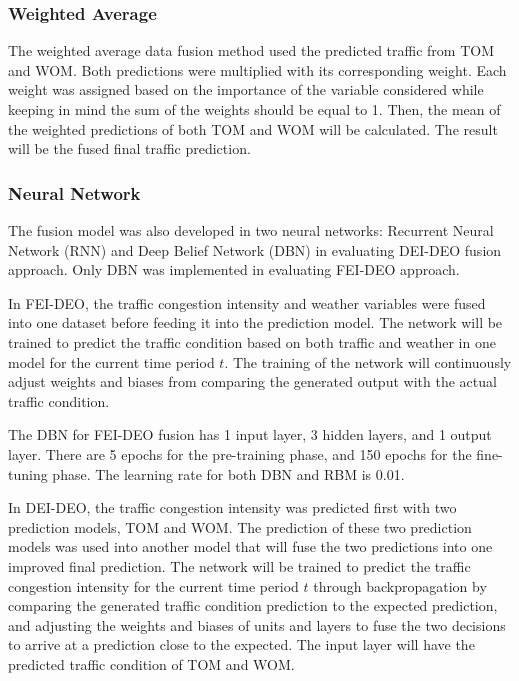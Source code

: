 \subsubsection{Weighted Average}
The weighted average data fusion method used the predicted traffic from TOM and WOM. Both predictions were multiplied with its corresponding weight. Each weight was assigned based on the importance of the variable considered while keeping in mind the sum of the weights should be equal to 1. Then, the mean of the weighted predictions of both TOM and WOM will be calculated. The result will be the fused final traffic prediction.



\subsubsection{Neural Network}
The fusion model was also developed in two neural networks: Recurrent Neural Network (RNN) and Deep Belief Network (DBN) in evaluating DEI-DEO fusion approach. Only DBN was implemented in evaluating FEI-DEO approach.

In FEI-DEO, the traffic congestion intensity and weather variables were fused into one dataset before feeding it into the prediction model. The network will be trained to predict the traffic condition based on both traffic and weather in one model for the current time period $t$. The training of the network will continuously adjust weights and biases from comparing the generated output with the actual traffic condition.

The DBN for FEI-DEO fusion has 1 input layer, 3 hidden layers, and 1 output layer. There are 5 epochs for the pre-training phase, and 150 epochs for the fine-tuning phase. The learning rate for both DBN and RBM is 0.01.

In DEI-DEO, the traffic congestion intensity was predicted first with two prediction models, TOM and WOM. The prediction of these two prediction models was used into another model that will fuse the two predictions into one improved final prediction. The network will be trained to predict the traffic congestion intensity for the current time period $t$ through backpropagation by comparing the generated traffic condition prediction to the expected prediction, and adjusting the weights and biases of units and layers to fuse the two decisions to arrive at a prediction close to the expected. The input layer will have the predicted traffic condition of TOM and WOM.

